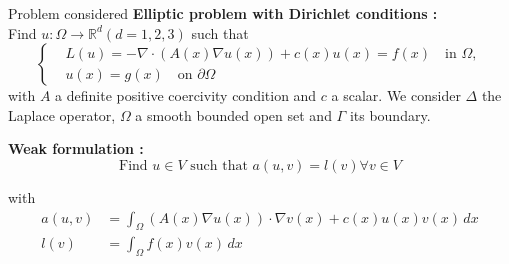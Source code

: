 \begin{frame}{Problem considered}
    \textbf{Elliptic problem with Dirichlet conditions :} \\
    Find $u : \Omega \rightarrow \mathbb{R}^d (d=1,2,3)$ such that
    \begin{equation}
    	\left\{\begin{aligned}
    		&L(u)=-\nabla \cdot (A(x) \nabla u(x)) + c(x)u(x) = f(x) \quad \text{in } \Omega, \\
    		&u(x) = g(x) \quad \text{on } \partial \Omega
    	\end{aligned}\right. \label{edp}
    \end{equation}
	with $A$ a definite positive coercivity condition and $c$ a scalar. We consider $\Delta$ the Laplace operator, $\Omega$ a smooth bounded open set and $\Gamma$ its boundary. 
	
    \textbf{Weak formulation :}
    \begin{equation*}
    	\text{Find } u\in V \text{ such that } a(u, v) = l (v) \forall v\in V
    \end{equation*}
    
    with
    \begin{align*}
    	a(u,v)&=\int_{\Omega} (A(x)\nabla u(x)) \cdot \nabla v(x) + c(x)u(x)v(x) \, dx \\
    	l(v)&=\int_{\Omega} f(x)v(x) \, dx
    \end{align*}
\end{frame}

